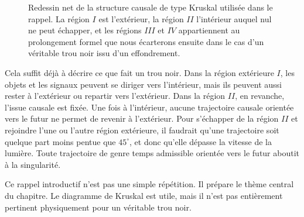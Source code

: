 \begin{figure}[htbp]
\centering
{}
\caption{Redessin net de la structure causale de type Kruskal utilisée dans le rappel. La région \(I\) est l’extérieur, la région \(II\) l’intérieur auquel nul ne peut échapper, et les régions \(III\) et \(IV\) appartiennent au prolongement formel que nous écarterons ensuite dans le cas d’un véritable trou noir issu d’un effondrement.}
\end{figure}

Cela suffit déjà à décrire ce que fait un trou noir. Dans la région extérieure \(I\), les objets et les signaux peuvent se diriger vers l’intérieur, mais ils peuvent aussi rester à l’extérieur ou repartir vers l’extérieur. Dans la région \(II\), en revanche, l’issue causale est fixée. Une fois à l’intérieur, aucune trajectoire causale orientée vers le futur ne permet de revenir à l’extérieur. Pour s’échapper de la région \(II\) et rejoindre l’une ou l’autre région extérieure, il faudrait qu’une trajectoire soit quelque part moins pentue que \(45^\circ\), et donc qu’elle dépasse la vitesse de la lumière. Toute trajectoire de genre temps admissible orientée vers le futur aboutit à la singularité.

Ce rappel introductif n’est pas une simple répétition. Il prépare le thème central du chapitre. Le diagramme de Kruskal est utile, mais il n’est pas entièrement pertinent physiquement pour un véritable trou noir.

\begin{classroomqa}
\end{classroomqa}

